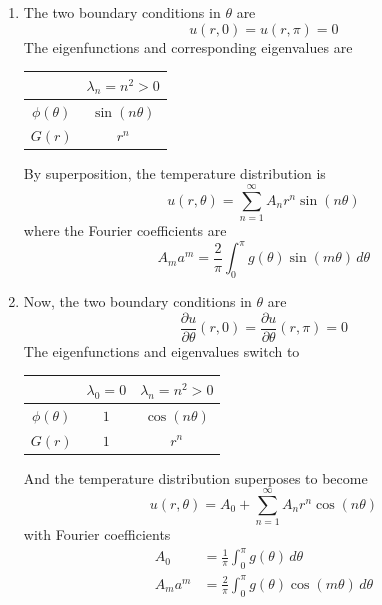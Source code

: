 \documentclass[a4paper]{article}
\begin{document}
\begin{enumerate}[label=(\alph*)]
	\item The two boundary conditions in \( \theta \) are
	\[
		u \!\left( r,0 \right) = u \!\left( r,\pi \right) = 0 
	\]
	The eigenfunctions and corresponding eigenvalues are
	\begin{center}
		\renewcommand{\arraystretch}{1.8}
		\setlength{\arraycolsep}{10pt}
		\begin{tabular}{|c||c|}
			\hline
			\rule[-1.2em]{0pt}{3em}
			 & \( \lambda_{n} = n^{2} > 0 \) \\
			\hline\hline
			\rule[-1.2em]{0pt}{3em}
					\( \phi \!\left( \theta \right) \) & \( \sin\!\left(n \theta\right) \) \\
			\hline
			\rule[-1.2em]{0pt}{3em}
					\( G \!\left( r \right) \) & \( r^{n} \) \\
			\hline
		\end{tabular}
	\end{center}
	By superposition, the temperature distribution is
	\[
		u \!\left( r,\theta \right) = \sum^{\infty}_{n=1} A_{n}r^{n}\sin\!\left(n \theta\right) 
	\]
	where the Fourier coefficients are
	\[
		A_{m}a^{m} = \frac{2}{\pi}\int^{\pi}_{0} g \!\left( \theta \right)\sin\!\left(m \theta\right) \, d \theta  
	\]
	\item Now, the two boundary conditions in \( \theta \) are
	\[
		\frac{\partial u}{\partial \theta}\!\left( r,0 \right) = \frac{\partial u}{\partial \theta}\!\left( r,\pi \right) = 0
	\]
	\newpage
	The eigenfunctions and eigenvalues switch to
	\begin{center}
		\renewcommand{\arraystretch}{1.8}
		\setlength{\arraycolsep}{10pt}
		\begin{tabular}{|c||c|c|}
			\hline
			\rule[-1.2em]{0pt}{3em}
			 & \( \lambda_{0} = 0 \) & \( \lambda_{n} = n^{2} > 0 \) \\
			\hline\hline
			\rule[-1.2em]{0pt}{3em}
					\( \phi \!\left( \theta \right) \) & \( 1 \) & \( \cos\!\left(n \theta\right) \) \\
			\hline
			\rule[-1.2em]{0pt}{3em}
					\( G \!\left( r \right) \) & \( 1 \) & \( r^{n} \) \\
			\hline
		\end{tabular}
	\end{center}
	And the temperature distribution superposes to become
	\[
		u \!\left( r,\theta \right) = A_{0} + \sum^{\infty}_{n=1} A_{n}r^{n}\cos\!\left(n \theta\right) 
	\]
	with Fourier coefficients
	\begin{align*}
		A_{0} & = \frac{1}{\pi}\int^{\pi}_{0} g \!\left( \theta \right) \, d \theta \\
		A_{m}a^{m} & = \frac{2}{\pi}\int^{\pi}_{0} g \!\left( \theta \right)\cos\!\left(m \theta\right) \, d \theta
	\end{align*}
\end{enumerate}
\end{document}
